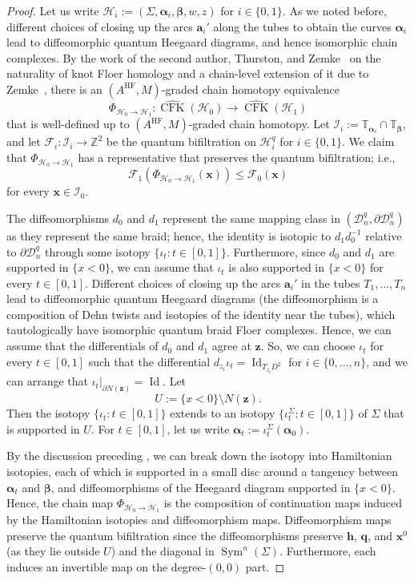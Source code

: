 \documentclass[11pt]{amsart}
\numberwithin{equation}{section}
\numberwithin{figure}{section}
\theoremstyle{definition}
\newcommand{\cD}{\mathcal{D}}
\newcommand{\cF}{\mathcal{F}}
\newcommand{\cH}{\mathcal{H}}
\newcommand{\cI}{\mathcal{I}}
\newcommand{\bT}{\mathbb{T}}
\newcommand{\bZ}{\mathbb{Z}}
\DeclareMathOperator{\Id}{Id}
\DeclareMathOperator{\Sym}{Sym}
\DeclareMathOperator{\CFK}{CFK}
\newcommand{\CFKh}{\widehat{\CFK}}
\DeclareMathOperator{\HF}{HF}
\newcommand{\as}{\boldsymbol{\alpha}}
\newcommand{\bs}{\boldsymbol{\beta}}
\newcommand{\ba}{\boldsymbol{a}}
\newcommand{\hs}{\boldsymbol{h}}
\newcommand{\qs}{\boldsymbol{q}}
\newcommand{\xs}{\boldsymbol{x}}
\newcommand{\zs}{\boldsymbol{z}}
\begin{document}
\begin{proof}
    Let us write $\cH_i := (\Sigma,\as_i,\bs, w, z)$ for $i \in \{0,1\}$. As we noted before, different choices of closing up the arcs $\ba_i'$ along the tubes to obtain the curves $\as_i$ lead to diffeomorphic quantum Heegaard diagrams, and hence isomorphic chain complexes.  By the work of the second author, Thurston, and Zemke~\cite[Section~9]{naturality} on the naturality of knot Floer homology and a chain-level extension of it due to Zemke~\cite[Proposition~3.5]{Zemke}, there is an $(A^{\HF}, M)$-graded chain homotopy equivalence
    \[
    \Phi_{\cH_0 \to \cH_1} \colon \CFKh(\cH_0) \to \CFKh(\cH_1)
    \]
    that is well-defined up to $(A^{\HF}, M)$-graded chain homotopy. Let $\cI_i := \bT_{\as_i} \cap \bT_{\bs}$, and let $\cF_i \colon \cI_i \to \bZ^2$ be the quantum bifiltration on $\cH^q_i$ for $i \in \{0,1\}$. We claim that $\Phi_{\cH_0 \to \cH_1}$ has a representative that preserves the quantum bifiltration; i.e.,
    \begin{equation}\label{eqn:filtered-naturality}
    \cF_1(\Phi_{\cH_0 \to \cH_1}(\xs)) \le \cF_0(\xs)
    \end{equation}
    for every $\xs \in \cI_0$.

    The diffeomorphisms $d_0$ and $d_1$ represent the same mapping class in $(\cD_n^q, \partial \cD_n^q)$ as they represent the same braid; hence, the identity is isotopic to $d_1d_0^{-1}$ relative to $\partial \cD_n^q$ through some isotopy $\{\iota_t : t \in [0,1]\}$. Furthermore, since $d_0$ and $d_1$ are supported in $\{x<0\}$, we can assume that $\iota_t$ is also supported in $\{x<0\}$ for every $t \in [0,1]$. Different choices of closing up the arcs $\ba_i'$ in the tubes $T_1,\dots,T_n$ lead to diffeomorphic quantum Heegaard diagrams (the diffeomorphism is a composition of Dehn twists and isotopies of the identity near the tubes), which tautologically have isomorphic quantum braid Floer complexes. Hence, we can assume that the differentials of $d_0$ and $d_1$ agree at $\zs$. So, we can choose $\iota_t$ for every $t \in [0,1]$ such that the differential $d_{z_i}\iota_t = \Id_{T_{z_i}D^2}$ for $i \in \{0,\dots,n\}$, and we can arrange that $\iota_t|_{\partial N(\zs)} = \Id$. Let 
    \[
    U := \{x<0\} \setminus N(\zs).
    \]
    Then the isotopy $\{\iota_t : t \in [0,1]\}$ extends to an isotopy $\{\iota_t^\Sigma : t \in [0,1]\}$ of $\Sigma$ that is supported in $U$. For $t \in [0,1]$, let us write $\as_t := \iota_t^\Sigma(\as_0)$.
    
    By the discussion preceding \cite[Definition~5.5]{OS}, we can break down the isotopy into Hamiltonian isotopies, each of which is supported in a small disc around a tangency between $\as_t$ and $\bs$, and diffeomorphisms of the Heegaard diagram supported in $\{x<0\}$. Hence, the chain map $\Phi_{\cH_0 \to \cH_1}$ is the composition of continuation maps induced by the Hamiltonian isotopies and diffeomorphism maps. Diffeomorphism maps preserve the quantum bifiltration since the diffeomorphisms preserve $\hs$, $\qs$, and $\xs^0$ (as they lie outside $U$) and the diagonal in $\Sym^n(\Sigma)$. Furthermore, each induces an invertible map on the degree-$(0,0)$ part.
    

\end{proof}
\end{document}

